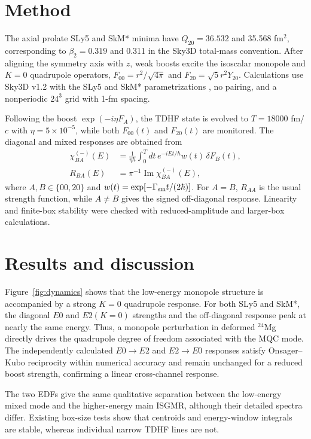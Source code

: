 \documentclass[twocolumn,amsmath,amssymb]{snp}
\begin{document}
\section*{Method}
The axial prolate SLy5 and SkM* minima have $Q_{20}=36.532$ and
35.568 fm$^2$, corresponding to $\beta_2=0.319$ and 0.311 in the
Sky3D total-mass convention. After aligning the symmetry axis with $z$,
weak boosts excite the isoscalar monopole and $K=0$ quadrupole operators,
$F_{00}=r^2/\sqrt{4\pi}$ and $F_{20}=\sqrt{5}r^2Y_{20}$.
Calculations use Sky3D v1.2 \cite{abhishek2024} with the SLy5 and SkM*
parametrizations \cite{forces}, no pairing, and a nonperiodic $24^3$
grid with 1-fm spacing.

Following the boost $\exp(-i\eta F_A)$, the TDHF state is evolved to
$T=18000$ fm/$c$ with $\eta=5\times10^{-5}$, while both $F_{00}(t)$
and $F_{20}(t)$ are monitored. The diagonal and mixed responses are
obtained from
\begin{equation}
 \begin{split}
 \chi^{(-)}_{BA}(E)&=\frac{1}{\eta\hbar}\int_0^T\!dt\,
 e^{-iEt/\hbar}w(t)\,\delta F_B(t),\\
 R_{BA}(E)&=\pi^{-1}\operatorname{Im}\chi^{(-)}_{BA}(E),
 \end{split}
\end{equation}
where $A,B\in\{00,20\}$ and
$w(t)=\exp[-\Gamma_{\rm sm}t/(2\hbar)]$.
For $A=B$, $R_{AA}$ is the usual strength function, while $A\ne B$
gives the signed off-diagonal response. Linearity and finite-box
stability were checked with reduced-amplitude and larger-box calculations.

\section*{Results and discussion}

Figure~\ref{fig:dynamics} shows that the low-energy monopole structure is
accompanied by a strong $K=0$ quadrupole response. For both SLy5 and SkM*,
the diagonal $E0$ and $E2(K=0)$ strengths and the off-diagonal response peak
at nearly the same energy. Thus, a monopole perturbation in deformed
$^{24}$Mg directly drives the quadrupole degree of freedom associated with
the MQC mode. The independently calculated $E0\!\rightarrow\!E2$ and
$E2\!\rightarrow\!E0$ responses satisfy Onsager--Kubo reciprocity
\cite{kubo1957} within numerical accuracy and remain unchanged for a reduced
boost strength, confirming a linear cross-channel response.

The two EDFs give the same qualitative separation between the low-energy
mixed mode and the higher-energy main ISGMR, although their detailed spectra
differ. Existing box-size tests show that centroids and energy-window
integrals are stable, whereas individual narrow TDHF lines are not.
\end{document}
